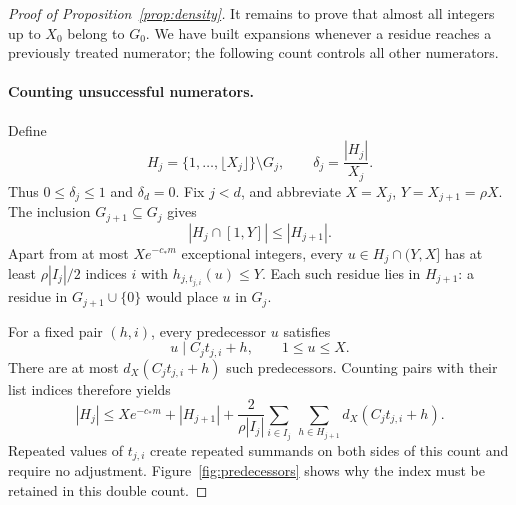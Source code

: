 \begin{proof}[Proof of Proposition~\ref{prop:density}]
It remains to prove that almost all integers up to \(X_0\) belong to
\(G_0\).  We have built expansions whenever a residue reaches a
previously treated numerator; the following count controls all other
numerators.

\paragraph{Counting unsuccessful numerators.}
Define
\[
 H_j=\{1,\ldots,\lfloor X_j\rfloor\}\setminus G_j,
 \qquad
 \delta_j=\frac{|H_j|}{X_j}.
\]
Thus \(0\le\delta_j\le1\) and \(\delta_d=0\).
Fix \(j<d\), and abbreviate \(X=X_j\), \(Y=X_{j+1}=\rho X\).
The inclusion \(G_{j+1}\subseteq G_j\) gives
\[
 |H_j\cap[1,Y]|\le |H_{j+1}|.
\]
Apart from at most \(Xe^{-c_*m}\) exceptional integers, every
\(u\in H_j\cap(Y,X]\) has at least \(\rho|I_j|/2\) indices \(i\)
with \(h_{j,t_{j,i}}(u)\le Y\).
Each such residue lies in \(H_{j+1}\): a residue in
\(G_{j+1}\cup\{0\}\) would place \(u\) in \(G_j\).

For a fixed pair \((h,i)\), every predecessor \(u\) satisfies
\[
 u\mid C_jt_{j,i}+h,\qquad 1\le u\le X.
\]
There are at most \(d_X(C_jt_{j,i}+h)\) such predecessors.
Counting pairs with their list indices therefore yields
\begin{equation}\label{eq:bad-pair-count}
 |H_j|\le Xe^{-c_*m}+|H_{j+1}|
 +\frac{2}{\rho|I_j|}
   \sum_{i\in I_j}\ \sum_{h\in H_{j+1}}
       d_X(C_jt_{j,i}+h).
\end{equation}
Repeated values of \(t_{j,i}\) create repeated summands on both sides
of this count and require no adjustment. Figure~\ref{fig:predecessors}
shows why the index must be retained in this double count.


\end{proof}
